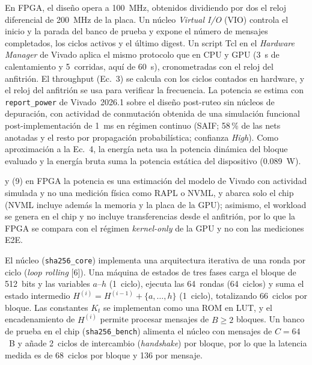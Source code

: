 En FPGA, el diseño opera a 100~MHz, obtenidos dividiendo por dos el reloj
diferencial de 200~MHz de la placa. Un núcleo \textit{Virtual I/O} (VIO)
controla el inicio y la parada del banco de prueba y expone el número de
mensajes completados, los ciclos activos y el último digest. Un script Tcl en
el \textit{Hardware Manager} de Vivado aplica el mismo protocolo que en CPU y
GPU (3~s de calentamiento y 5~corridas, aquí de 60~s), cronometradas con el
reloj del anfitrión. El throughput (Ec.~3) se calcula con los ciclos contados
en hardware, y el reloj del anfitrión se usa para verificar la frecuencia.
La potencia se estima con \texttt{report\_power} de Vivado~2026.1 sobre el
diseño post-ruteo sin núcleos de depuración, con actividad de conmutación
obtenida de una simulación funcional post-implementación de 1~ms en régimen
continuo (SAIF; 58\,\% de las nets anotadas y el resto por propagación
probabilística; confianza \textit{High}). Como aproximación a la Ec.~4, la
energía neta usa la potencia dinámica del bloque evaluado y la energía bruta
suma la potencia estática del dispositivo (0.089~W).


y (9) en FPGA la potencia es una estimación del modelo de Vivado con
actividad simulada y no una medición física como RAPL o NVML, y abarca solo
el chip (NVML incluye además la memoria y la placa de la GPU); asimismo, el
workload se genera en el chip y no incluye transferencias desde el
anfitrión, por lo que la FPGA se compara con el régimen \textit{kernel-only}
de la GPU y no con las mediciones E2E.


El núcleo (\texttt{sha256\_core}) implementa una arquitectura iterativa de
una ronda por ciclo (\textit{loop rolling} [6]). Una máquina de estados de
tres fases carga el bloque de 512~bits y las variables $a$--$h$ (1~ciclo),
ejecuta las 64~rondas (64~ciclos) y suma el estado intermedio
$H^{(i)} = H^{(i-1)} + \{a,\dots,h\}$ (1~ciclo), totalizando 66~ciclos por
bloque. Las constantes $K_t$ se implementan como una ROM en LUT, y el
encadenamiento de $H^{(i)}$ permite procesar mensajes de $B \geq 2$ bloques.
Un banco de prueba en el chip (\texttt{sha256\_bench}) alimenta el núcleo con
mensajes de $C = 64$~B y añade 2~ciclos de intercambio (\textit{handshake})
por bloque, por lo que la latencia medida es de 68~ciclos por bloque y 136
por mensaje.


